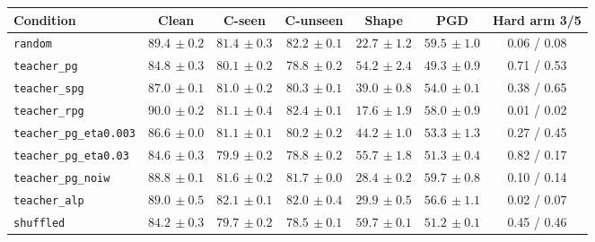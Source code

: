 \begin{tabular}{lcccccc}
\hline
Condition & Clean & C-seen & C-unseen & Shape & PGD & Hard arm 3/5 \\
\hline
\texttt{random} & $89.4{\scriptstyle\,\pm0.2}$ & $81.4{\scriptstyle\,\pm0.3}$ & $82.2{\scriptstyle\,\pm0.1}$ & $22.7{\scriptstyle\,\pm1.2}$ & $59.5{\scriptstyle\,\pm1.0}$ & 0.06 / 0.08 \\
\texttt{teacher\_pg} & $84.8{\scriptstyle\,\pm0.3}$ & $80.1{\scriptstyle\,\pm0.2}$ & $78.8{\scriptstyle\,\pm0.2}$ & $54.2{\scriptstyle\,\pm2.4}$ & $49.3{\scriptstyle\,\pm0.9}$ & 0.71 / 0.53 \\
\texttt{teacher\_spg} & $87.0{\scriptstyle\,\pm0.1}$ & $81.0{\scriptstyle\,\pm0.2}$ & $80.3{\scriptstyle\,\pm0.1}$ & $39.0{\scriptstyle\,\pm0.8}$ & $54.0{\scriptstyle\,\pm0.1}$ & 0.38 / 0.65 \\
\texttt{teacher\_rpg} & $90.0{\scriptstyle\,\pm0.2}$ & $81.1{\scriptstyle\,\pm0.4}$ & $82.4{\scriptstyle\,\pm0.1}$ & $17.6{\scriptstyle\,\pm1.9}$ & $58.0{\scriptstyle\,\pm0.9}$ & 0.01 / 0.02 \\
\texttt{teacher\_pg\_eta0.003} & $86.6{\scriptstyle\,\pm0.0}$ & $81.1{\scriptstyle\,\pm0.1}$ & $80.2{\scriptstyle\,\pm0.2}$ & $44.2{\scriptstyle\,\pm1.0}$ & $53.3{\scriptstyle\,\pm1.3}$ & 0.27 / 0.45 \\
\texttt{teacher\_pg\_eta0.03} & $84.6{\scriptstyle\,\pm0.3}$ & $79.9{\scriptstyle\,\pm0.2}$ & $78.8{\scriptstyle\,\pm0.2}$ & $55.7{\scriptstyle\,\pm1.8}$ & $51.3{\scriptstyle\,\pm0.4}$ & 0.82 / 0.17 \\
\texttt{teacher\_pg\_noiw} & $88.8{\scriptstyle\,\pm0.1}$ & $81.6{\scriptstyle\,\pm0.2}$ & $81.7{\scriptstyle\,\pm0.0}$ & $28.4{\scriptstyle\,\pm0.2}$ & $59.7{\scriptstyle\,\pm0.8}$ & 0.10 / 0.14 \\
\texttt{teacher\_alp} & $89.0{\scriptstyle\,\pm0.5}$ & $82.1{\scriptstyle\,\pm0.1}$ & $82.0{\scriptstyle\,\pm0.4}$ & $29.9{\scriptstyle\,\pm0.5}$ & $56.6{\scriptstyle\,\pm1.1}$ & 0.02 / 0.07 \\
\texttt{shuffled} & $84.2{\scriptstyle\,\pm0.3}$ & $79.7{\scriptstyle\,\pm0.2}$ & $78.5{\scriptstyle\,\pm0.1}$ & $59.7{\scriptstyle\,\pm0.1}$ & $51.2{\scriptstyle\,\pm0.1}$ & 0.45 / 0.46 \\
\hline
\end{tabular}
